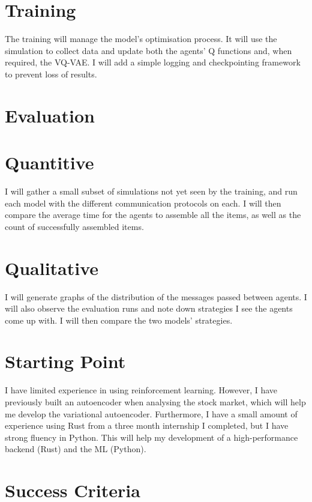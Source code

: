 \documentclass[20pt]{article}
\begin{document}
\section*{Training}
The training will manage the model's optimisation process. It will use the simulation to collect data and update both the agents' Q functions and, when required, the VQ-VAE. I will add a simple logging and checkpointing framework to prevent loss of results.

\section{Evaluation}

\section*{Quantitive}
I will gather a small subset of simulations not yet seen by the training, and run each model with the different communication protocols on each. I will then compare the average time for the agents to assemble all the items, as well as the count of successfully assembled items.

\section*{Qualitative}
I will generate graphs of the distribution of the messages passed between agents. I will also observe the evaluation runs and note down strategies I see the agents come up with. I will then compare the two models' strategies.


\section{Starting Point}
I have limited experience in using reinforcement learning. However, I have previously built an autoencoder when analysing the stock market, which will help me develop the variational autoencoder. Furthermore, I have a small amount of experience using Rust from a three month internship I completed, but I have strong fluency in Python. This will help my development of a high-performance backend (Rust) and the ML (Python).


\section{Success Criteria}
\end{document}
